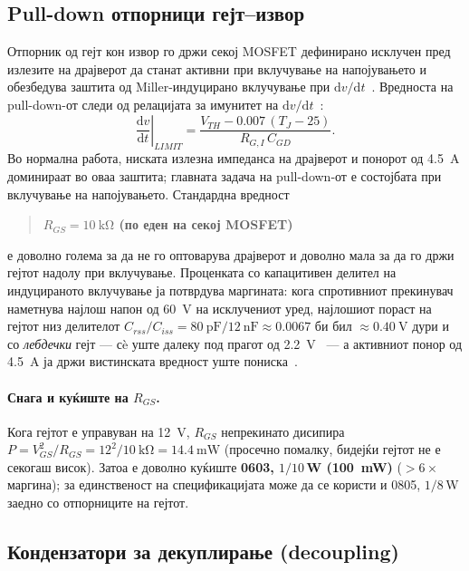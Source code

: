 \documentclass[journal,onecolumn,11pt]{IEEEtran}
\begin{document}
\subsection{Pull-down отпорници гејт--извор}\label{sec:pulldown}
Отпорник од гејт кон извор го држи секој MOSFET дефинирано исклучен пред излезите на
драјверот да станат активни при вклучување на напојувањето и обезбедува заштита од
Miller-индуцирано вклучување при $\mathrm{d}v/\mathrm{d}t$~\cite{balogh}. Вредноста на
pull-down-от следи од релацијата за имунитет на $\mathrm{d}v/\mathrm{d}t$~\cite{balogh}:
\begin{equation}
\left.\frac{\mathrm{d}v}{\mathrm{d}t}\right|_{LIMIT}=\frac{V_{TH}-0.007\,(T_J-25)}{R_{G,I}\,C_{GD}}.
\end{equation}
Во нормална работа, ниската излезна импеданса на драјверот и понорот од
\SI{4.5}{\ampere} доминираат во оваа заштита; главната задача на pull-down-от е
состојбата при вклучување на напојувањето. Стандардна вредност
\begin{quote}
\textbf{$R_{GS}=\SI{10}{\kilo\ohm}$ (по еден на секој MOSFET)}
\end{quote}
е доволно голема за да не го оптоварува драјверот и доволно мала за да го држи гејтот
надолу при вклучување. Проценката со капацитивен делител на индуцираното вклучување
ја потврдува маргината: кога спротивниот прекинувач наметнува најлош напон од
\SI{60}{\volt} на исклучениот уред, најлошиот пораст на гејтот низ делителот
$C_{rss}/C_{iss}=\SI{80}{\pico\farad}/\SI{12}{\nano\farad}\approx 0.0067$ би бил
$\approx\SI{0.40}{\volt}$ дури и со \emph{лебдечки} гејт --- сè уште далеку под прагот
од \SI{2.2}{\volt}~\cite{ipt015ds} --- а активниот понор од \SI{4.5}{\ampere} ја држи
вистинската вредност уште пониска~\cite{ucc27211}.

\paragraph{Снага и куќиште на $R_{GS}$.} Кога гејтот е управуван на \SI{12}{\volt},
$R_{GS}$ непрекинато дисипира $P=V_{GS}^2/R_{GS}=12^2/\SI{10}{\kilo\ohm}=\SI{14.4}{\milli\watt}$
(просечно помалку, бидејќи гејтот не е секогаш висок). Затоа е доволно куќиште
\textbf{0603, $1/10$\,W (\SI{100}{\milli\watt})} ($>6\times$ маргина); за
единственост на спецификацијата може да се користи и 0805, $1/8$\,W заедно со
отпорниците на гејтот.

\subsection{Кондензатори за декуплирање (decoupling)}
\end{document}
